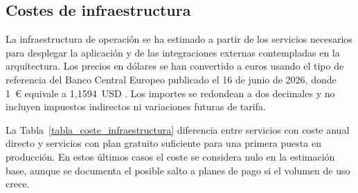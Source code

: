\subsection{Costes de infraestructura}

La infraestructura de operación se ha estimado a partir de los servicios necesarios para desplegar la aplicación y de las integraciones externas contempladas en la arquitectura. Los precios en dólares se han convertido a euros usando el tipo de referencia del Banco Central Europeo publicado el 16 de junio de 2026, donde 1~\euro{} equivale a 1,1594~USD \citep{ecb2026usdeur}. Los importes se redondean a dos decimales y no incluyen impuestos indirectos ni variaciones futuras de tarifa.

La Tabla~\ref{tabla_coste_infraestructura} diferencia entre servicios con coste anual directo y servicios con plan gratuito suficiente para una primera puesta en producción. En estos últimos casos el coste se considera nulo en la estimación base, aunque se documenta el posible salto a planes de pago si el volumen de uso crece.

